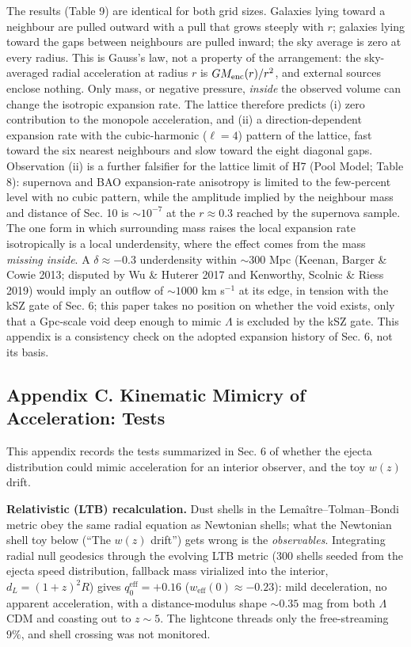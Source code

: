 \documentclass[
  11pt,
]{article}
\begin{document}
The results (Table 9) are identical for both grid sizes. Galaxies lying
toward a neighbour are pulled outward with a pull that grows steeply
with \(r\); galaxies lying toward the gaps between neighbours are pulled
inward; the sky average is zero at every radius. This is Gauss's law,
not a property of the arrangement: the sky-averaged radial acceleration
at radius \(r\) is \(G M_{\rm enc}(r)/r^2\), and external sources
enclose nothing. Only mass, or negative pressure, \emph{inside} the
observed volume can change the isotropic expansion rate. The lattice
therefore predicts (i) zero contribution to the monopole acceleration,
and (ii) a direction-dependent expansion rate with the cubic-harmonic
(\(\ell = 4\)) pattern of the lattice, fast toward the six nearest
neighbours and slow toward the eight diagonal gaps. Observation (ii) is
a further falsifier for the lattice limit of H7 (Pool Model; Table 8):
supernova and BAO expansion-rate anisotropy is limited to the
few-percent level with no cubic pattern, while the amplitude implied by
the neighbour mass and distance of Sec. 10 is \(\sim\!10^{-7}\) at the
\(r \approx 0.3\) reached by the supernova sample. The one form in which
surrounding mass raises the local expansion rate isotropically is a
local underdensity, where the effect comes from the mass \emph{missing
inside}. A \(\delta \approx -0.3\) underdensity within \(\sim\!300\) Mpc
(Keenan, Barger \& Cowie 2013; disputed by Wu \& Huterer 2017 and
Kenworthy, Scolnic \& Riess 2019) would imply an outflow of
\(\sim\!1000\) km s\(^{-1}\) at its edge, in tension with the kSZ gate
of Sec. 6; this paper takes no position on whether the void exists, only
that a Gpc-scale void deep enough to mimic \(\Lambda\) is excluded by
the kSZ gate. This appendix is a consistency check on the adopted
expansion history of Sec. 6, not its basis.

\hypertarget{appendix-c.-kinematic-mimicry-of-acceleration-tests}{%
\subsection{\texorpdfstring{\textbf{Appendix C. Kinematic Mimicry of
Acceleration:
Tests}}{Appendix C. Kinematic Mimicry of Acceleration: Tests}}\label{appendix-c.-kinematic-mimicry-of-acceleration-tests}}

This appendix records the tests summarized in Sec. 6 of whether the
ejecta distribution could mimic acceleration for an interior observer,
and the toy \(w(z)\) drift.

\textbf{Relativistic (LTB) recalculation.} Dust shells in the
Lemaître--Tolman--Bondi metric obey the same radial equation as
Newtonian shells; what the Newtonian shell toy below (``The \(w(z)\)
drift'') gets wrong is the \emph{observables}. Integrating radial null
geodesics through the evolving LTB metric (300 shells seeded from the
ejecta speed distribution, fallback mass virialized into the interior,
\(d_L = (1+z)^2 R\)) gives \(q_0^{\text{eff}} = +0.16\)
(\(w_{\text{eff}}(0) \approx -0.23\)): mild deceleration, no apparent
acceleration, with a distance-modulus shape \(\sim\!0.35\) mag from both
\(\Lambda\)CDM and coasting out to \(z \sim 5\). The lightcone threads
only the free-streaming \(9\%\), and shell crossing was not monitored.
\end{document}
